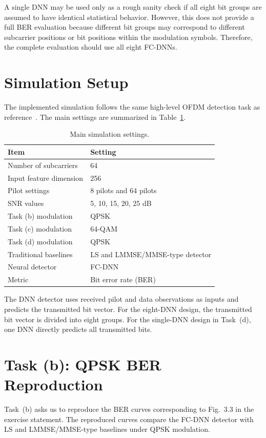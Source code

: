 \documentclass[11pt,a4paper]{article}
\begin{document}
A single DNN may be used only as a rough sanity check if all eight bit groups are assumed to have identical statistical behavior. However, this does not provide a full BER evaluation because different bit groups may correspond to different subcarrier positions or bit positions within the modulation symbols. Therefore, the complete evaluation should use all eight FC-DNNs.

\section{Simulation Setup}

The implemented simulation follows the same high-level OFDM detection task as reference~\cite{ye2017power}. The main settings are summarized in Table~\ref{tab:setup}.

\begin{table}[h]
\centering
\caption{Main simulation settings.}
\label{tab:setup}
\begin{tabular}{ll}
\toprule
Item & Setting \\
\midrule
Number of subcarriers & 64 \\
Input feature dimension & 256 \\
Pilot settings & 8 pilots and 64 pilots \\
SNR values & 5, 10, 15, 20, 25 dB \\
Task (b) modulation & QPSK \\
Task (c) modulation & 64-QAM \\
Task (d) modulation & QPSK \\
Traditional baselines & LS and LMMSE/MMSE-type detector \\
Neural detector & FC-DNN \\
Metric & Bit error rate (BER) \\
\bottomrule
\end{tabular}
\end{table}

The DNN detector uses received pilot and data observations as inputs and predicts the transmitted bit vector. For the eight-DNN design, the transmitted bit vector is divided into eight groups. For the single-DNN design in Task~(d), one DNN directly predicts all transmitted bits.

\section{Task (b): QPSK BER Reproduction}

Task~(b) asks us to reproduce the BER curves corresponding to Fig.~3.3 in the exercise statement. The reproduced curves compare the FC-DNN detector with LS and LMMSE/MMSE-type baselines under QPSK modulation.
\end{document}
